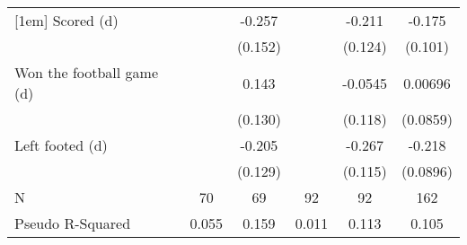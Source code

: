 {\begin{tabular}{l*{5}{c}}
[1em]
Scored (d)          &                     &      -0.257\sym{*}  &                     &      -0.211\sym{*}  &      -0.175\sym{*}  \\
                    &                     &     (0.152)         &                     &     (0.124)         &     (0.101)         \\
[1em]
Won the football game (d)&                     &       0.143         &                     &     -0.0545         &     0.00696         \\
                    &                     &     (0.130)         &                     &     (0.118)         &    (0.0859)         \\
[1em]
Left footed (d)     &                     &      -0.205         &                     &      -0.267\sym{**} &      -0.218\sym{**} \\
                    &                     &     (0.129)         &                     &     (0.115)         &    (0.0896)         \\
\hline
N                   &          70         &          69         &          92         &          92         &         162         \\
Pseudo R-Squared    &       0.055         &       0.159         &       0.011         &       0.113         &       0.105         \\
\hline\hline
\end{tabular}
}
